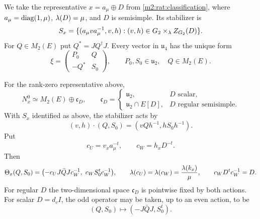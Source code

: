 We take the representative $x=a_\mu\oplus D$ from
\cref{m2:rat:classification}, where $a_\mu=\operatorname{diag}(1,\mu)$,
$\lambda(D)=\mu$, and $D$ is semisimple.  Its stabilizer is
\[
 S_x=\{(a_\mu v a_\mu^{-1},v,h):
       (v,h)\in G_2\times_\lambda Z_{G_2}(D)\}.
\]
For $Q\in M_2(E)$ put $Q^*=JQ^\dagger J$.  Every vector in
$\mathfrak u_4$ has the unique form
\begin{equation}\label{m2:nor:unitary-blocks}
 \xi=\begin{pmatrix}P_0&Q\\-Q^*&S_0\end{pmatrix},
 \qquad P_0,S_0\in\mathfrak u_2,
 \quad Q\in M_2(E).
\end{equation}

\begin{proposition}\label{m2:nor:zero-normal}
For the rank-zero representative above,
\[
 N_x^0\simeq M_2(E)\oplus\mathfrak c_D,
 \qquad
 \mathfrak c_D=
 \begin{cases}
 \mathfrak u_2,&D\text{ scalar},\\
 \mathfrak u_2\cap E[D],&D\text{ regular semisimple}.
 \end{cases}
\]
With $S_x$ identified as above, the stabilizer acts by
\begin{equation}\label{m2:nor:zero-action}
 (v,h)\cdot(Q,S_0)=(vQh^{-1},hS_0h^{-1}).
\end{equation}
Put
\[
 c_U=v_xa_\mu^{-t},\qquad c_W=h_xD^{-t}.
\]
Then
\begin{equation}\label{m2:nor:zero-odd}
 \Theta_x(Q,S_0)=
 \bigl(-c_UJ\bar QJc_W^{-1},\ c_WS_0^tc_W^{-1}\bigr),
 \qquad
 \lambda(c_U)=\lambda(c_W)=\frac{\lambda(k_x)}\mu,
 \qquad c_WD^tc_W^{-1}=D.
\end{equation}
For regular $D$ the two-dimensional space $\mathfrak c_D$ is
pointwise fixed by both actions.  For scalar $D=d_cI$, the odd
operator may be taken, up to an even action, to be
\[
 (Q,S_0)\longmapsto(-J\bar QJ,S_0^t).
\]
\end{proposition}

